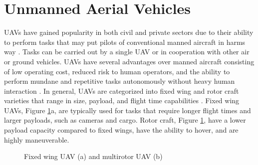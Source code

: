 \documentclass[numbered,pdftex]{ohio-etd}
\begin{document}
\section{Unmanned Aerial Vehicles}
UAVs have gained popularity in both civil and private sectors due to their ability to perform tasks that may put pilots of conventional manned aircraft in harms way \cite{bone_uavs_2003}. Tasks can be carried out by a single UAV or in cooperation with other air \cite{oh_coordinated_2013,hyondong_oh_coordinated_2015,wise_uav_2006} or ground \cite{ulun_coordinated_2013} vehicles. UAVs have several advantages over manned aircraft consisting of low operating cost, reduced risk to human operators, and the ability to perform mundane and repetitive tasks autonomously without heavy human interaction \cite{austin2011unmanned}. In general, UAVs are categorized into fixed wing and rotor craft varieties that range in size, payload, and flight time capabilities \cite{beard_small_2012}. Fixed wing UAVs, Figure \ref{fig:fixedMultirotor}a, are typically used for tasks that require longer flight times and larger payloads, such as cameras and cargo. Rotor craft, Figure \ref{fig:fixedMultirotor}, have a lower payload capacity compared to fixed wings, have the ability to hover, and are highly maneuverable.
\begin{figure}[H]
	\begin{subfigmatrix}{2}%
		\centering	
		\hspace*{0mm}
	\end{subfigmatrix}
	\caption{Fixed wing UAV (a) and multirotor UAV (b)}
	\label{fig:fixedMultirotor}
\end{figure}
\end{document}
